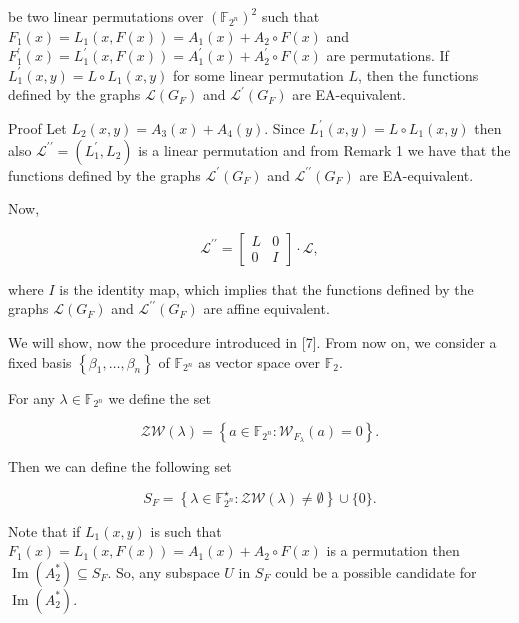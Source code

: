 \documentclass[10pt]{article}
\begin{document}
be two linear permutations over $\left(\mathbb{F}_{2^{n}}\right)^{2}$ such that $F_{1}(x)=L_{1}(x, F(x))=A_{1}(x)+A_{2} \circ F(x)$ and $F_{1}^{\prime}(x)=L_{1}^{\prime}(x, F(x))=A_{1}^{\prime}(x)+A_{2}^{\prime} \circ F(x)$ are permutations. If $L_{1}^{\prime}(x, y)=L \circ L_{1}(x, y)$ for some linear permutation $L$, then the functions defined by the graphs $\mathscr{L}\left(G_{F}\right)$ and $\mathscr{L}^{\prime}\left(G_{F}\right)$ are EA-equivalent.

Proof Let $L_{2}(x, y)=A_{3}(x)+A_{4}(y)$. Since $L_{1}^{\prime}(x, y)=L \circ L_{1}(x, y)$ then also $\mathscr{L}^{\prime \prime}= \left(L_{1}^{\prime}, L_{2}\right)$ is a linear permutation and from Remark 1 we have that the functions defined by the graphs $\mathscr{L}^{\prime}\left(G_{F}\right)$ and $\mathscr{L}^{\prime \prime}\left(G_{F}\right)$ are EA-equivalent.

Now,

$$
\mathscr{L}^{\prime \prime}=\left[\begin{array}{cc}
L & 0 \\
0 & I
\end{array}\right] \cdot \mathscr{L},
$$

where $I$ is the identity map, which implies that the functions defined by the graphs $\mathscr{L}\left(G_{F}\right)$ and $\mathscr{L}^{\prime \prime}\left(G_{F}\right)$ are affine equivalent.

We will show, now the procedure introduced in [7]. From now on, we consider a fixed basis $\left\{\beta_{1}, \ldots, \beta_{n}\right\}$ of $\mathbb{F}_{2^{n}}$ as vector space over $\mathbb{F}_{2}$.

For any $\lambda \in \mathbb{F}_{2^{n}}$ we define the set

$$
\mathcal{Z} \mathcal{W}(\lambda)=\left\{a \in \mathbb{F}_{2^{n}}: \mathscr{W}_{F_{\lambda}}(a)=0\right\} .
$$

Then we can define the following set


\begin{equation*}
S_{F}=\left\{\lambda \in \mathbb{F}_{2^{n}}^{\star}: \mathcal{Z} \mathcal{W}(\lambda) \neq \emptyset\right\} \cup\{0\} . \tag{4}
\end{equation*}


Note that if $L_{1}(x, y)$ is such that $F_{1}(x)=L_{1}(x, F(x))=A_{1}(x)+A_{2} \circ F(x)$ is a permutation then $\operatorname{Im}\left(A_{2}^{*}\right) \subseteq S_{F}$. So, any subspace $U$ in $S_{F}$ could be a possible candidate for $\operatorname{Im}\left(A_{2}^{*}\right)$.
\end{document}
